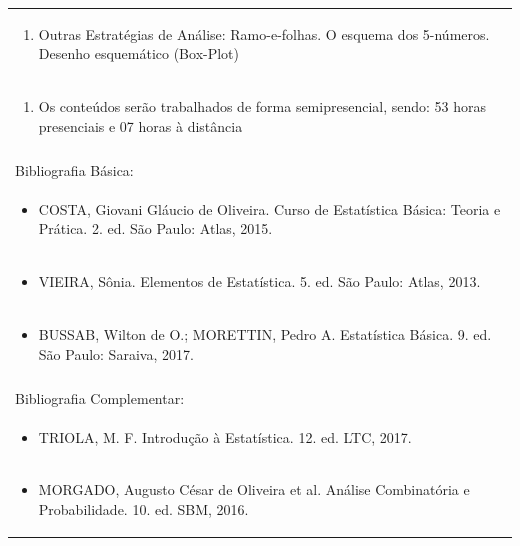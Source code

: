 \documentclass[11pt]{article}
\begin{document}
\begin{center}
\begin{longtable}{|p{4cm}|p{4cm}|p{4cm}|p{4cm}|}
\multicolumn{4}{|p{\dimexpr 16cm + 6\tabcolsep\relax}|}{\begin{enumerate}[start=9]\item Outras Estratégias de Análise: Ramo-e-folhas. O esquema dos 5-números. Desenho esquemático (Box-Plot)\end{enumerate}}\\
\multicolumn{4}{|p{\dimexpr 16cm + 6\tabcolsep\relax}|}{\begin{enumerate}[start=10]\item Os conteúdos serão trabalhados de forma semipresencial, sendo: 53 horas presenciais e 07 horas à distância\end{enumerate}}\\
\multicolumn{4}{|p{\dimexpr 16cm + 6\tabcolsep\relax}|}{}\\
\hline
\multicolumn{4}{|p{16cm}|}{Bibliografia Básica:}\\*
\multicolumn{4}{|p{\dimexpr 16cm + 6\tabcolsep\relax}|}{\begin{itemize}\item COSTA, Giovani Gláucio de Oliveira. Curso de Estatística Básica: Teoria e Prática. 2. ed. São Paulo: Atlas, 2015.\end{itemize}}\\
\multicolumn{4}{|p{\dimexpr 16cm + 6\tabcolsep\relax}|}{\begin{itemize}\item VIEIRA, Sônia. Elementos de Estatística. 5. ed. São Paulo: Atlas, 2013.\end{itemize}}\\
\multicolumn{4}{|p{\dimexpr 16cm + 6\tabcolsep\relax}|}{\begin{itemize}\item BUSSAB, Wilton de O.; MORETTIN, Pedro A. Estatística Básica. 9. ed. São Paulo: Saraiva, 2017.\end{itemize}}\\
\multicolumn{4}{|p{16cm}|}{}\\
\hline
\multicolumn{4}{|p{16cm}|}{Bibliografia Complementar:}\\*
\multicolumn{4}{|p{\dimexpr 16cm + 6\tabcolsep\relax}|}{\begin{itemize}\item TRIOLA, M. F. Introdução à Estatística. 12. ed. LTC, 2017.\end{itemize}}\\
\multicolumn{4}{|p{\dimexpr 16cm + 6\tabcolsep\relax}|}{\begin{itemize}\item MORGADO, Augusto César de Oliveira et al. Análise Combinatória e Probabilidade. 10. ed. SBM, 2016.\end{itemize}}\\

\end{longtable}
\end{center}
\end{document}
